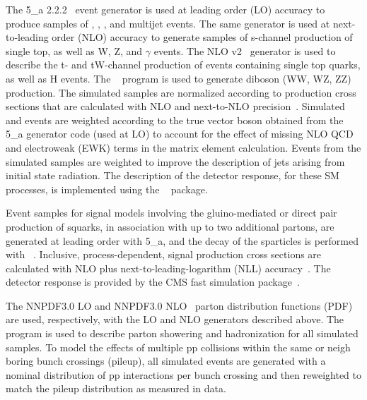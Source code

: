 The {\MADGRAPH{}5\_a\MCATNLO} 2.2.2~\cite{Alwall2014} event generator
is used at leading order (LO) accuracy to produce samples of \wj, \zj,
\ttbar, and multijet events. The same generator is used at
next-to-leading order (NLO) accuracy to generate samples of s-channel
production of single top, as well as {\ttbar}W, {\ttbar}Z, and
{\ttbar}$\gamma$ events. The NLO \POWHEG v2~\cite{powheg,
  powheg_top_Wt} generator is used to describe the t- and tW-channel
production of events containing single top quarks, as well as
{\ttbar}H events. The ~\cite{pythia} program is used to
generate diboson (WW, WZ, ZZ) production. The simulated samples are
normalized according to production cross sections that are calculated
with NLO and next-to-NLO precision~\cite{Alwall2014, wphys, fewz,
  wwxs, top++, nlotop, powheg_top_Wt}. Simulated \wj and \zj events
are weighted according to the true vector boson \pt obtained from the
{\MADGRAPH{}5\_a\MCATNLO} generator code (used at LO) to account for
the effect of missing NLO QCD and electroweak (EWK) terms in the
matrix element calculation. Events from the \ttbar simulated samples
are weighted to improve the description of jets arising from initial
state radiation. The description of the detector response, for these
SM processes, is implemented using the \GEANTfour~\cite{geant}
package.

Event samples for signal models involving the gluino-mediated or
direct pair production of squarks, in association with up to two
additional partons, are generated at leading order with
{\MADGRAPH{}5\_a\MCATNLO}, and the decay of the sparticles is
performed with ~\cite{pythia}. Inclusive,
process-dependent, signal production cross sections are calculated
with NLO plus next-to-leading-logarithm (NLL)
accuracy~\cite{Beenakker:1996ch, PhysRevLett.102.111802,
  PhysRevD.80.095004, 1126-6708-2009-12-041,
  doi:10.1142/S0217751X11053560, susynlo}. The detector response is
provided by the CMS fast simulation package~\cite{fastsim}.

The \textsc{NNPDF}3.0 LO and \textsc{NNPDF}3.0 NLO~\cite{nnpdf} parton
distribution functions (PDF) are used, respectively, with the LO and
NLO generators described above. The ~\cite{pythia} program
is used to describe parton showering and hadronization for all
simulated samples. To model the effects of multiple pp collisions
within the same or neigh boring bunch crossings (pileup), all simulated
events are generated with a nominal distribution of pp interactions
per bunch crossing and then reweighted to match the pileup
distribution as measured in data.

